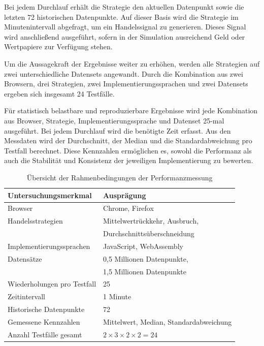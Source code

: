 Bei jedem Durchlauf erhält die Strategie den aktuellen Datenpunkt sowie die letzten 72 historischen Datenpunkte. 
Auf dieser Basis wird die Strategie im Minutenintervall abgefragt, um ein Handelssignal zu generieren.
Dieses Signal wird anschließend ausgeführt, sofern in der Simulation ausreichend Geld oder Wertpapiere zur Verfügung stehen.

Um die Aussagekraft der Ergebnisse weiter zu erhöhen, werden alle Strategien auf zwei unterschiedliche Datensets angewandt.
Durch die Kombination aus zwei Browsern, drei Strategien, zwei Implementierungssprachen und zwei Datensets ergeben sich insgesamt 24 Testfälle.

Für statistisch belastbare und reproduzierbare Ergebnisse wird jede Kombination aus Browser, Strategie, Implementierungssprache und Datenset 25-mal ausgeführt. 
Bei jedem Durchlauf wird die benötigte Zeit erfasst. Aus den Messdaten wird der Durchschnitt, der Median und die Standardabweichung pro Testfall berechnet. 
Diese Kennzahlen ermöglichen es, sowohl die Performanz als auch die Stabilität und Konsistenz der jeweiligen Implementierung zu bewerten.

\begin{table}[H]
    \centering
    \begin{tabular}{ll}
        \hline
        \textbf{Untersuchungsmerkmal} & \textbf{Ausprägung} \\
        \hline
        Browser & Chrome, Firefox \\
        Handelsstrategien & Mittelwertrückkehr, Ausbruch, \\
         & Durchschnittsüberschneidung \\
        Implementierungssprachen & JavaScript, WebAssembly \\
        Datensätze & 0,5 Millionen Datenpunkte, \\
         & 1,5 Millionen Datenpunkte \\
        Wiederholungen pro Testfall & 25 \\
        Zeitintervall & 1 Minute \\
        Historische Datenpunkte & 72 \\
        Gemessene Kennzahlen & Mittelwert, Median, Standardabweichung \\
        \hline
        Anzahl Testfälle gesamt & $2 \times 3 \times 2 \times 2 = 24$ \\
        \hline
    \end{tabular}
    \caption{Übersicht der Rahmenbedingungen der Performanzmessung}
    \label{tab:ÜbersichtderRahmenbedingungenderPerformanzmessung}
\end{table}

